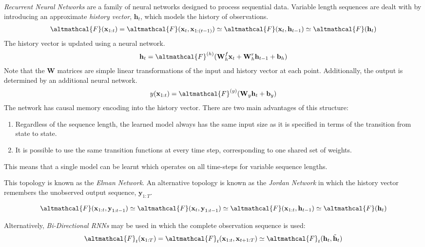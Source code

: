 \documentclass[a4paper]{book}
\newcommand{\vect}[1]{\boldsymbol{\mathbf{#1}}}
\newcommand{\marfig}[2]{
  \marginpar{ \texttt{[image: \#1]} \centering \text{\small #2} }
}
\begin{document}
\marfig{figs/rnns}{Recurrent Neural Networks} \emph{Recurrent Neural Networks} are a family of neural networks designed to process sequential data. Variable length sequences are dealt with by introducing an approximate \emph{history vector}, $\vect{h}_t$, which models the history of observations. 
\begin{align}
\altmathcal{F}(\vect{x}_{1:t}) = \altmathcal{F}(\vect{x}_t, \vect{x}_{1:(t-1)}) \simeq \altmathcal{F}(\vect{x}_t, \vect{h}_{t-1}) \simeq \altmathcal{F}(\vect{h}_t)
\end{align}
The history vector is updated using a neural network. 
\begin{align}
\vect{h}_t = \altmathcal{F}^{(h)} (\vect{W}_h^f\vect{x}_t + \vect{W}_h^r\vect{h}_{t-1} + \vect{b}_h)
\end{align}
Note that the $\vect{W}$ matrices are simple linear transformations of the input and history vector at each point. Additionally, the output is determined by an additional neural network.
\begin{align}
y(\vect{x}_{1:t}) = \altmathcal{F}^{(y)}(\vect{W}_y \vect{h}_t + \vect{b}_y)
\end{align}
The network has causal memory encoding into the history vector. There are two main advantages of this structure:
\begin{enumerate}
	\item Regardless of the sequence length, the learned model always has the same input size as it is specified in terms of the transition from state to state. 
	\item It is possible to use the same transition functions at every time step, corresponding to one shared set of weights. 
\end{enumerate}
This means that a single model can be learnt which operates on all time-steps for variable sequence lengths. 

\marfig{figs/jordan_network}{}This topology is known as the \emph{Elman Network}. An alternative topology is known as the \emph{Jordan Network} in which the history vector remembers the unobserved output sequence, $\vect{y}_{1:T}$.

\begin{align}
\altmathcal{F}(\vect{x}_{1:t}, \vect{y}_{1:t-1}) \simeq \altmathcal{F}(\vect{x}_{t}, \vect{y}_{1:t-1}) \simeq \altmathcal{F}(\vect{x}_{1:t}, \vect{h}_{t-1}) \simeq \altmathcal{F}(\vect{h}_t)
\end{align}

\marfig{figs/bi-rnn}{}Alternatively, \emph{Bi-Directional RNNs} may be used in which the complete observation sequence is used:
\begin{align}
\altmathcal{F}_t(\vect{x}_{1:T}) = \altmathcal{F}_t(\vect{x}_{1:t}, \vect{x}_{t+1:T}) \simeq \altmathcal{F}_t(\vect{h}_t, \tilde{\vect{h}}_t)
\end{align} 
\end{document}
